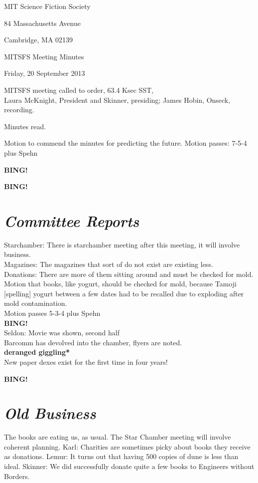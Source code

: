 \documentclass[10pt]{article}
\newcommand{\bing}{{\bf BING!} }
\newcommand{\goto}[1]{\bing \vskip 12pt \section*{{\em{#1}}}}
\newcommand{\ps}{ plus Spehn\xspace}
\newcommand{\skinner}{Laura McKnight, President and Skinner}
\newcommand{\onseck}{James Hobin, Onseck}
\newcommand{\meetingdate}{Friday, 20 September 2013}
\begin{document}
\begin{center}

MIT Science Fiction Society

84 Massachusetts Avenue

Cambridge, MA 02139

\vspace{12pt}

MITSFS Meeting Minutes

\meetingdate

\end{center}

\vspace{18pt}

\setlength{\parskip}{6pt}

\noindent
MITSFS meeting called to order, 63.4 Ksec SST, \\
\skinner, presiding; \onseck, recording.

Minutes read.

Motion to commend the minutes for predicting the future. Motion passes: 7-5-4 \ps

\bing

\goto{Committee Reports}
Starchamber: There is starchamber meeting after this meeting, it will involve business. \\
Magazines: The magazines that sort of do not exist are existing less. \\
Donations: There are more of them sitting around and must be checked for mold. \\
Motion that books, like yogurt, should be checked for mold, because Tamoji
[spelling] yogurt between a few dates had to be recalled due to exploding after
mold contamination. \\
Motion passes 5-3-4 \ps \\
\bing \\
Seldon: Movie was shown, second half \\
Barcomm has devolved into the chamber, flyers are noted. \\
{\bf *deranged giggling*} \\
New paper dexes exist for the first time in four years!


\goto{Old Business}
The books are eating us, as usual.
The Star Chamber meeting will involve coherent planning.
Karl: Charities are sometimes picky about books they receive as donations.
Lemur: It turns out that having 500 copies of dune is less than ideal.
Skinner: We did successfully donate quite a few books to Engineers without Borders.
\end{document}
